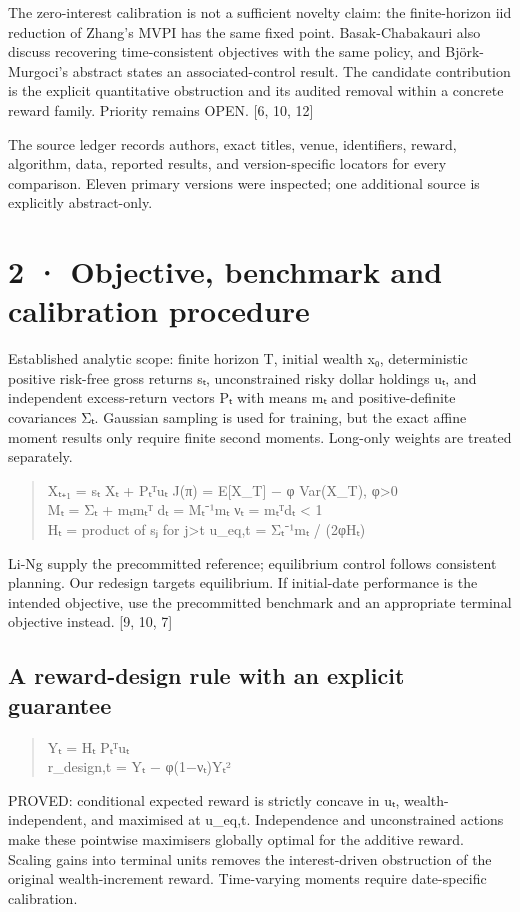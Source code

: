 \documentclass[10pt,a4paper]{article}
\begin{document}
The zero-interest calibration is not a sufficient novelty claim: the finite-horizon iid reduction of Zhang’s MVPI has the same fixed point. Basak-Chabakauri also discuss recovering time-consistent objectives with the same policy, and Björk-Murgoci’s abstract states an associated-control result. The candidate contribution is the explicit quantitative obstruction and its audited removal within a concrete reward family. Priority remains OPEN. [6, 10, 12]

The source ledger records authors, exact titles, venue, identifiers, reward, algorithm, data, reported results, and version-specific locators for every comparison. Eleven primary versions were inspected; one additional source is explicitly abstract-only.

\clearpage
\section*{2 · Objective, benchmark and calibration procedure}
Established analytic scope: finite horizon T, initial wealth x₀, deterministic positive risk-free gross returns sₜ, unconstrained risky dollar holdings uₜ, and independent excess-return vectors Pₜ with means mₜ and positive-definite covariances Σₜ. Gaussian sampling is used for training, but the exact affine moment results only require finite second moments. Long-only weights are treated separately.

\begin{quote}\small
Xₜ₊₁ = sₜ Xₜ + Pₜᵀuₜ      J(π) = E[X\_T] − φ Var(X\_T), φ>0\\
Mₜ = Σₜ + mₜmₜᵀ     dₜ = Mₜ⁻¹mₜ     νₜ = mₜᵀdₜ < 1\\
Hₜ = product of sⱼ for j>t      u\_eq,t = Σₜ⁻¹mₜ / (2φHₜ)
\end{quote}
Li-Ng supply the precommitted reference; equilibrium control follows consistent planning. Our redesign targets equilibrium. If initial-date performance is the intended objective, use the precommitted benchmark and an appropriate terminal objective instead. [9, 10, 7]

\subsection*{A reward-design rule with an explicit guarantee}
\begin{quote}\small
Yₜ = Hₜ Pₜᵀuₜ\\
r\_design,t = Yₜ − φ(1−νₜ)Yₜ²
\end{quote}
PROVED: conditional expected reward is strictly concave in uₜ, wealth-independent, and maximised at u\_eq,t. Independence and unconstrained actions make these pointwise maximisers globally optimal for the additive reward. Scaling gains into terminal units removes the interest-driven obstruction of the original wealth-increment reward. Time-varying moments require date-specific calibration.
\end{document}

